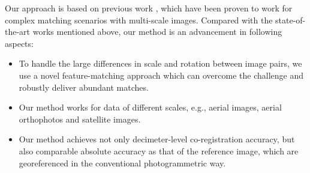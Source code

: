 Our approach is based on previous work \cite{koch2016new,zhuo2016fusion}, which have been proven to work for complex matching scenarios with multi-scale images. 
Compared with the state-of-the-art works mentioned above, our method is an advancement in following aspects:
\begin{itemize}[leftmargin=*,labelsep=4mm]
\item To handle the large differences in scale and rotation between image pairs, we use a novel feature-matching approach which can overcome the challenge and robustly deliver abundant matches.
\item Our method works for data of different scales, e.g., aerial images, aerial orthophotos and satellite images.
\item Our method achieves not only decimeter-level co-registration accuracy, but also comparable absolute accuracy as that of the reference image, which are georeferenced in the conventional photogrammetric way.
\end{itemize}














